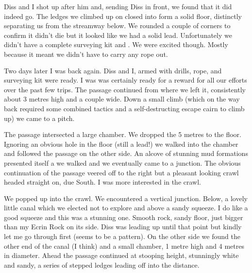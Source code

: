 Diss and I shot up after him and, sending Diss in front, we found that it did indeed go. The ledges we climbed up on closed into form a solid floor, distinctly separating us from the streamway below. We rounded a couple of corners to confirm it didn't die but it looked like we had a solid lead. Unfortunately we didn't have a complete surveying kit and . We were excited though. Mostly because it meant we didn't have to carry any rope out.
 
Two days later I was back again. Diss and I, armed with drills, rope, and surveying kit were ready. I was was certainly ready for a reward for all our efforts over the past few trips. The passage continued from where we left it, consistently about 3 metres high and a couple wide. Down a small climb (which on the way back required some combined tactics and a self-destructing escape cairn to climb up) we came to a pitch.

The passage intersected a large chamber. We dropped the 5 metres to the floor. Ignoring an obvious hole in the floor (still a lead!) we walked into the chamber and followed the passage on the other side. An alcove of stunning mud formations presented itself a we walked and we eventually came to a junction. The obvious continuation of the passage veered off to the right but a pleasant looking crawl headed straight on, due South. I was more interested in the crawl.  


We popped up into the crawl. We encountered a vertical junction. Below, a lovely little canal which we elected not to explore and above a sandy squeeze. I do like a good squeeze and this was a stunning one. Smooth rock, sandy floor, just bigger than my Ecrin Rock on its side. Diss was leading up until that point but kindly let me go through first (seems to be a pattern). On the other side we found the other end of the canal (I think) and a small chamber, 1 metre high and 4 metres in diameter. Ahead the passage continued at stooping height, stunningly white and sandy, a series of stepped ledges leading off into the distance.
 

